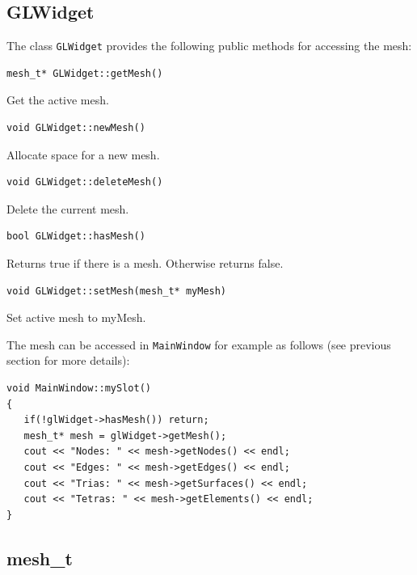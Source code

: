 \documentclass[a4paper,12pt]{article}
\begin{document}
\subsection{GLWidget}

The class {\tt GLWidget} provides the following public methods for accessing the mesh:
\begin{verbatim}
mesh_t* GLWidget::getMesh()
\end{verbatim}
Get the active mesh.
\begin{verbatim}
void GLWidget::newMesh()
\end{verbatim}
Allocate space for a new mesh.
\begin{verbatim}
void GLWidget::deleteMesh()
\end{verbatim}
Delete the current mesh.
\begin{verbatim}
bool GLWidget::hasMesh()
\end{verbatim}
Returns true if there is a mesh. Otherwise returns false.
\begin{verbatim}
void GLWidget::setMesh(mesh_t* myMesh)
\end{verbatim}
Set active mesh to myMesh.

The mesh can be accessed in {\tt MainWindow} for example as follows
(see previous section for more details):
\begin{verbatim}
void MainWindow::mySlot()
{
   if(!glWidget->hasMesh()) return;
   mesh_t* mesh = glWidget->getMesh();
   cout << "Nodes: " << mesh->getNodes() << endl;
   cout << "Edges: " << mesh->getEdges() << endl;
   cout << "Trias: " << mesh->getSurfaces() << endl;
   cout << "Tetras: " << mesh->getElements() << endl;
}
\end{verbatim}

\subsection{mesh\_t}
\end{document}
